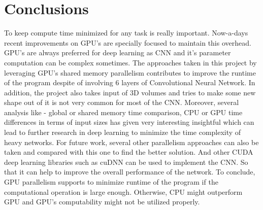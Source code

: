 \documentclass[11pt]{article}       %
\begin{document}
\section{Conclusions} \label{concl}
To keep compute time minimized for any task is really important. Now-a-days recent improvements on GPU's are specially focused to maintain this overhead. GPU's are always preferred for deep learning as CNN and it's parameter computation can be complex sometimes. The approaches taken in this project by leveraging GPU's shared memory parallelism contributes to improve the runtime of the program despite of involving 6 layers of Convolutional Neural Network. In addition, the project also takes input of 3D volumes and tries to make some new shape out of it is not very common for most of the CNN. Moreover, several analysis like - global or shared memory time comparison, CPU or GPU time differences in terms of input sizes has given very interesting insightful which can lead to further research in deep learning to minimize the time complexity  of heavy networks.\newline
For future work, several other parallelism approaches can also be taken and compared with this one to find the better solution. And other CUDA deep learning libraries such as cuDNN can be used to implement the CNN. So that it can help to improve the overall performance of the network. To conclude, GPU parallelism supports to minimize runtime of the program if the computational operation is large enough. Otherwise, CPU might outperform GPU and GPU's computability might not be utilized properly.




\end{document}
